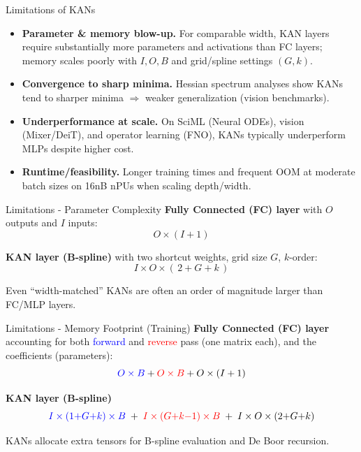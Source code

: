 \documentclass[aspectratio=169]{beamer}
\begin{document}
\begin{frame}{Limitations of KANs}
	\begin{itemize}
		\item \textbf{Parameter \& memory blow-up.} For comparable width, KAN layers require substantially more parameters and activations than FC layers; memory scales poorly with $I,O,B$ and grid/spline settings $(G,k)$.
		\item \textbf{Convergence to sharp minima.} Hessian spectrum analyses show KANs tend to sharper minima $\Rightarrow$ weaker generalization (vision benchmarks).
		\item \textbf{Underperformance at scale.} On SciML (Neural ODEs), vision (Mixer/DeiT), and operator learning (FNO), KANs typically underperform MLPs despite higher cost.
		\item \textbf{Runtime/feasibility.} Longer training times and frequent OOM at moderate batch sizes on 16nB nPUs when scaling depth/width.
	\end{itemize}
\end{frame}


\begin{frame}{Limitations - Parameter Complexity}
	\textbf{Fully Connected (FC) layer} with $O$ outputs and $I$ inputs:
	$$O \times (I+1)$$
	
	\textbf{KAN layer (B-spline)} with two shortcut weights, grid size $G$, $k$-order:
	$$I \times O \times (\,2 + G + k\,)$$
	
	Even ``width-matched'' KANs are often an order of magnitude larger than FC/MLP layers.
\end{frame}


\begin{frame}{Limitations - Memory Footprint (Training)}
	\textbf{Fully Connected (FC) layer} accounting for both \textcolor{blue}{forward} and \textcolor{red}{reverse} pass (one matrix each), and the coefficients (parameters):
	$$
	\textcolor{blue}{O \times B} + \textcolor{red}{O \times B} + O \times (I+1)
	$$
	
	\textbf{KAN layer (B-spline)}
	$$
	\textcolor{blue}{I \times (1{+}G{+}k) \times B} 
	\;+\; \textcolor{red}{I \times (G{+}k{-}1) \times B} 
	\;+\; I \times O \times (2{+}G{+}k)
	$$
	
	KANs allocate extra tensors for B-spline evaluation and De Boor recursion.
\end{frame}
\end{document}
